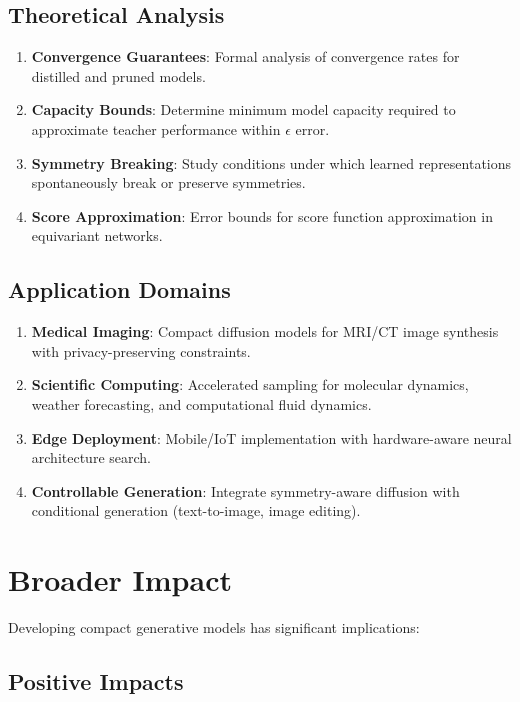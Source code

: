 \documentclass[12pt]{report}
\theoremstyle{definition}
\begin{document}
\subsection{Theoretical Analysis}

\begin{enumerate}
\item \textbf{Convergence Guarantees}: Formal analysis of convergence rates for distilled and pruned models.
\item \textbf{Capacity Bounds}: Determine minimum model capacity required to approximate teacher performance within $\epsilon$ error.
\item \textbf{Symmetry Breaking}: Study conditions under which learned representations spontaneously break or preserve symmetries.
\item \textbf{Score Approximation}: Error bounds for score function approximation in equivariant networks.
\end{enumerate}

\subsection{Application Domains}

\begin{enumerate}
\item \textbf{Medical Imaging}: Compact diffusion models for MRI/CT image synthesis with privacy-preserving constraints.
\item \textbf{Scientific Computing}: Accelerated sampling for molecular dynamics, weather forecasting, and computational fluid dynamics.
\item \textbf{Edge Deployment}: Mobile/IoT implementation with hardware-aware neural architecture search.
\item \textbf{Controllable Generation}: Integrate symmetry-aware diffusion with conditional generation (text-to-image, image editing).
\end{enumerate}

\section{Broader Impact}

Developing compact generative models has significant implications:

\subsection{Positive Impacts}
\end{document}
